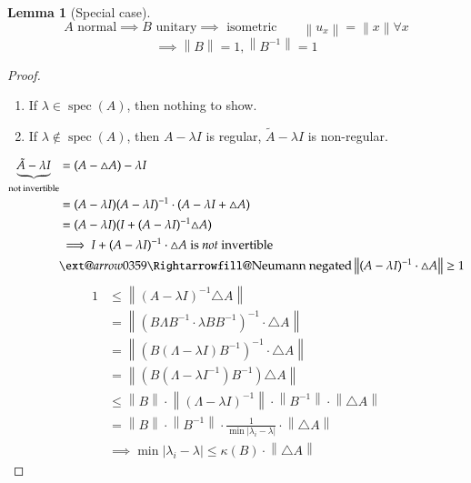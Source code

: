 \documentclass{article}
\makeatletter
\newtheorem{lemma}{Lemma}  \numberwithin{lemma}{section}
\newcommand{\norm}[1]{\left\|#1\right\|}
\newcommand{\card}[1]{\left|#1\right|}
\newcommand{\xRightarrow}[2][]{\ext@arrow 0359\Rightarrowfill@{#1}{#2}}
\makeatother
\begin{document}
\begin{lemma}[Special case]
  \[ A \text{ normal} \implies B \text{ unitary} \implies \text{ isometric} \qquad \norm{u_x} = \norm{x} \forall x \]
  \[ \implies \norm{B} = 1, \norm{B^{-1}} = 1 \]
\end{lemma}
\begin{proof}
  \begin{enumerate}
    \item If $\lambda \in \operatorname{spec}(A)$, then nothing to show.
    \item If $\lambda \not\in \operatorname{spec}(A)$, then $A - \lambda I$ is regular, $\tilde A - \lambda I$ is non-regular.
  \end{enumerate}
  \begin{align*}
    \underbrace{\tilde A - \lambda I}_{\text{not invertible}}
      &= (A - \triangle A) - \lambda I \\
      &= (A - \lambda I)(A - \lambda I)^{-1} \cdot (A - \lambda I + \triangle A) \\
      &= (A - \lambda I)(I + (A - \lambda I)^{-1} \triangle A) \\
      &\implies I + (A - \lambda I)^{-1} \cdot \triangle A \text{ is \emph{not} invertible} \\
      &\xRightarrow{\text{Neumann negated}} \norm{(A - \lambda I)^{-1} \cdot \triangle A} \geq 1
  \end{align*}
  \begin{align*}
    1 &\leq \norm{(A - \lambda I)^{-1} \triangle A} \\
      &= \norm{(B \Lambda B^{-1} \cdot \lambda BB^{-1})^{-1} \cdot \triangle A} \\
      &= \norm{\left(B \left(\Lambda - \lambda I\right) B^{-1}\right)^{-1} \cdot \triangle A} \\
      &= \norm{(B (\Lambda - \lambda I^{-1}) B^{-1}) \triangle A} \\
      &\leq \norm{B} \cdot \norm{(\Lambda - \lambda I)^{-1}} \cdot \norm{B^{-1}} \cdot \norm{\triangle A} \\
      &= \norm{B} \cdot \norm{B^{-1}} \cdot \frac{1}{\min\card{\lambda_i - \lambda}} \cdot \norm{\triangle A} \\
      &\implies \min\card{\lambda_i - \lambda} \leq \kappa(B) \cdot \norm{\triangle A}
  \end{align*}


\end{proof}
\end{document}
